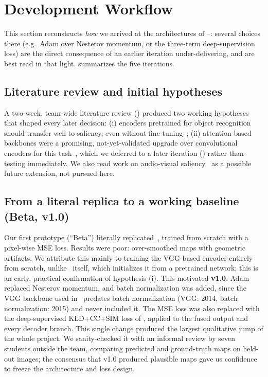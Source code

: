 
\section{Development Workflow}
\label{sec:workflow}

This section reconstructs \textit{how} we arrived at the architectures of --: several choices there (e.g.\ Adam over Nesterov momentum, or the three-term deep-supervision loss) are the direct consequence of an earlier iteration under-delivering, and are best read in that light.  summarizes the five iterations.

\subsection{Literature review and initial hypotheses}
\label{subsec:litreview}

A two-week, team-wide literature review () produced two working hypotheses that shaped every later decision: (i) encoders pretrained for object recognition should transfer well to saliency, even without fine-tuning~\cite{kummerer2016deepgaze}; (ii) attention-based backbones were a promising, not-yet-validated upgrade over convolutional encoders for this task~\cite{lou2022transalnet}, which we deferred to a later iteration () rather than testing immediately. We also read work on audio-visual saliency~\cite{zhu2024audio} as a possible future extension, not pursued here.

\subsection{From a literal replica to a working baseline (Beta, v1.0)}
\label{subsec:beta-v10}

Our first prototype (``Beta'') literally replicated~\cite{wang2018deep}, trained from scratch with a pixel-wise MSE loss. Results were poor: over-smoothed maps with geometric artifacts. We attribute this mainly to training the VGG-based encoder entirely from scratch, unlike~\cite{wang2018deep} itself, which initializes it from a pretrained network; this is an early, practical confirmation of hypothesis (i). This motivated \textbf{v1.0}: Adam replaced Nesterov momentum, and batch normalization was added, since the VGG backbone used in~\cite{wang2018deep} predates batch normalization (VGG: 2014, batch normalization: 2015) and never included it. The MSE loss was also replaced with the deep-supervised KLD+CC+SIM loss of , applied to the fused output and every decoder branch. This single change produced the largest qualitative jump of the whole project. We sanity-checked it with an informal review by seven students outside the team, comparing predicted and ground-truth maps on held-out images; the consensus that v1.0 produced plausible maps gave us confidence to freeze the architecture and loss design.

